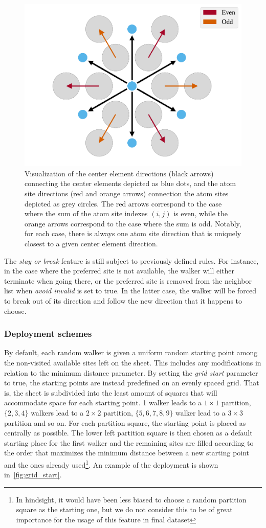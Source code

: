 \begin{figure}[h]
  \centering
  \includegraphics[width=0.5\linewidth]{figures/system/stay_or_break.pdf}
  \caption{Visualization of the center element directions (black arrows) connecting the center elements depicted as blue dots, and the atom site directions (red and orange arrows) connection the atom sites depicted as grey circles. The red arrows correspond to the case where the sum of the atom site indexes $(i,j)$ is even, while the orange arrows correspond to the case where the sum is odd. Notably, for each case, there is always one atom site direction that is uniquely closest to a given center element direction.}
  \label{fig:stay_or_break}
\end{figure}

The \textit{stay or break} feature is still subject to previously defined rules.
For instance, in the case where the preferred site is not available, the walker
will either terminate when going there, or the preferred site is removed from
the neighbor list when \textit{avoid invalid} is set to true. In the latter
case, the walker will be forced to break out of its direction and follow the new
direction that it happens to choose.


\subsubsection{Deployment schemes} %
By default, each random walker is given a uniform random starting point among
the non-visited available sites left on the sheet. This includes any
modifications in relation to the minimum distance parameter. By setting the
\textit{grid start} parameter to true, the starting points are instead
predefined on an evenly spaced grid. That is, the sheet is subdivided into the
least amount of squares that will accommodate space for each starting point. 1
walker leads to a $1\times 1$ partition, $\{2,3,4\}$ walkers lead to a $2\times
2$ partition, $\{5,6,7,8,9\}$ walker lead to a $3\times 3$ partition and so on.
For each partition square, the starting point is placed as centrally as
possible. The lower left partition square is then chosen as a default starting
place for the first walker and the remaining sites are filled according to the
order that maximizes the minimum distance between a new starting point and the
ones already used\footnote{In hindsight, it would have been less biased to
choose a random partition square as the starting one, but we do not consider
this to be of great importance for the usage of this feature in final dataset}.
An example of the deployment is shown in~\cref{fig:grid_start}.



